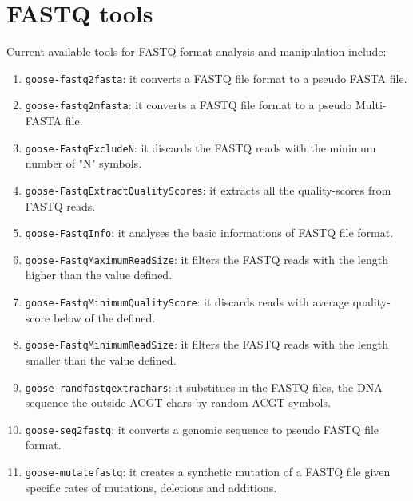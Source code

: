 \chapter{FASTQ tools}
\label{fastq}

Current available tools for FASTQ format analysis and manipulation include:
\begin{enumerate}

\item \texttt{goose-fastq2fasta}: it converts a FASTQ file format to a pseudo FASTA file.
\item \texttt{goose-fastq2mfasta}: it converts a FASTQ file format to a pseudo Multi-FASTA file.
\item \texttt{goose-FastqExcludeN}: it discards the FASTQ reads with the minimum number of "N" symbols.
\item \texttt{goose-FastqExtractQualityScores}: it extracts all the quality-scores from FASTQ reads.
\item \texttt{goose-FastqInfo}: it analyses the basic informations of FASTQ file format.
\item \texttt{goose-FastqMaximumReadSize}: it filters the FASTQ reads with the length higher than the value defined.
\item \texttt{goose-FastqMinimumQualityScore}: it discards reads with average quality-score below of the defined.
\item \texttt{goose-FastqMinimumReadSize}: it filters the FASTQ reads with the length smaller than the value defined.
\item \texttt{goose-randfastqextrachars}: it substitues in the FASTQ files, the DNA sequence the outside ACGT chars by random ACGT symbols.
\item \texttt{goose-seq2fastq}: it converts a genomic sequence to pseudo FASTQ file format.
\item \texttt{goose-mutatefastq}: it creates a synthetic mutation of a FASTQ file given specific rates of mutations, deletions and additions.


\end{enumerate}
